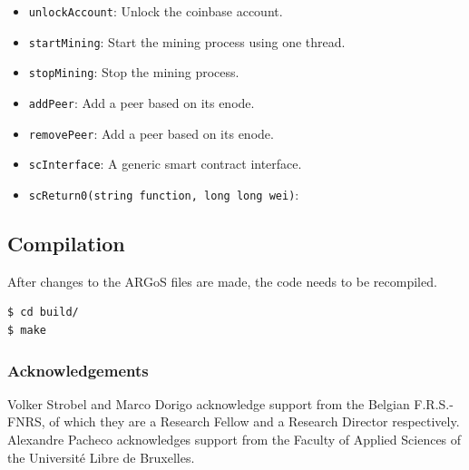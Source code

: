 \documentclass{article}
\begin{document}
\begin{itemize}
\item \texttt{unlockAccount}: Unlock the coinbase account.
\item \texttt{startMining}: Start the mining process using one thread.
\item \texttt{stopMining}: Stop the mining process.
\item \texttt{addPeer}: Add a peer based on its enode.
\item \texttt{removePeer}: Add a peer based on its enode.
\item \texttt{scInterface}: A generic smart contract interface.
\item \texttt{scReturn0(string function, long long wei)}: 
\end{itemize}

\subsection{Compilation}
\label{sec:compilation}

After changes to the ARGoS files are made, the code needs to be
recompiled.

\begin{verbatim}
$ cd build/
$ make
\end{verbatim}

\subsubsection*{Acknowledgements}

Volker Strobel and Marco Dorigo acknowledge support from the Belgian
F.R.S.-FNRS, of which they are a Research Fellow and a Research
Director respectively. Alexandre Pacheco acknowledges support from the
Faculty of Applied Sciences of the Universit\'{e} Libre de Bruxelles.




\end{document}
